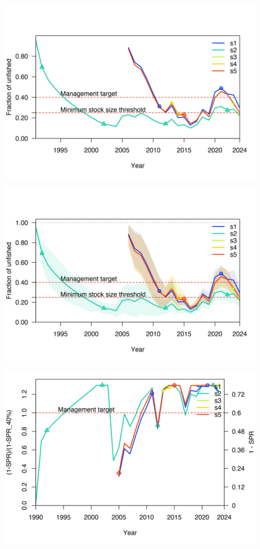 \documentclass[
]{article}
\begin{document}
\begin{center}\includegraphics{Dtrunculus_SS3_2024_files/figure-latex/unnamed-chunk-17-2} \end{center}

\begin{center}\includegraphics{Dtrunculus_SS3_2024_files/figure-latex/unnamed-chunk-17-3} \end{center}

\begin{center}\includegraphics{Dtrunculus_SS3_2024_files/figure-latex/unnamed-chunk-17-4} \end{center}
\end{document}
